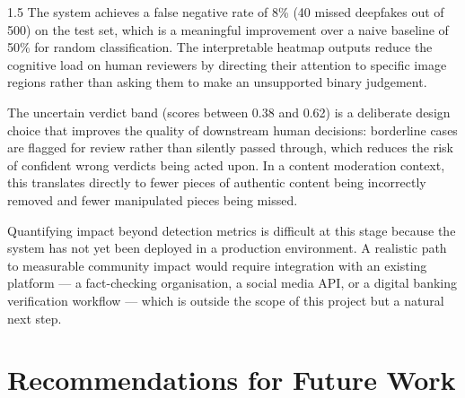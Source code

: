 \begin{spacing}{1.5}
The system achieves a false negative rate of 8\% (40 missed deepfakes out of 500) on the test set, which is a meaningful improvement over a naive baseline of 50\% for random classification. The interpretable heatmap outputs reduce the cognitive load on human reviewers by directing their attention to specific image regions rather than asking them to make an unsupported binary judgement.

The uncertain verdict band (scores between 0.38 and 0.62) is a deliberate design choice that improves the quality of downstream human decisions: borderline cases are flagged for review rather than silently passed through, which reduces the risk of confident wrong verdicts being acted upon. In a content moderation context, this translates directly to fewer pieces of authentic content being incorrectly removed and fewer manipulated pieces being missed.

Quantifying impact beyond detection metrics is difficult at this stage because the system has not yet been deployed in a production environment. A realistic path to measurable community impact would require integration with an existing platform --- a fact-checking organisation, a social media API, or a digital banking verification workflow --- which is outside the scope of this project but a natural next step.
\end{spacing}

\section{Recommendations for Future Work}

